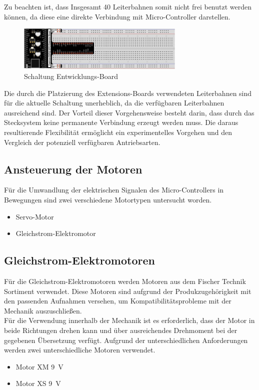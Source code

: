 \documentclass[conference,compsoc,final,a4paper]{IEEEtran}
\begin{document}
\noindent Zu beachten ist, dass Insgesamt 40 Leiterbahnen somit nicht frei benutzt werden können, da diese eine direkte Verbindung mit Micro-Controller darstellen.
\begin{figure}[h]
\centering
\includegraphics[width=8cm]{../images/ext_board.png}
\caption{Schaltung Entwicklungs-Board \autocite{freenoveTutorial}}
\label{Elektrik:DevBoardext}
\end{figure}

\noindent Die durch die Platzierung des Extensions-Boards verwendeten Leiterbahnen sind für die aktuelle Schaltung unerheblich, da die verfügbaren Leiterbahnen ausreichend sind. Der Vorteil dieser Vorgehensweise besteht darin, dass durch das Stecksystem keine permanente Verbindung erzeugt werden muss. 
Die daraus resultierende Flexibilität ermöglicht ein experimentelles Vorgehen und den Vergleich der potenziell verfügbaren Antriebsarten.

\subsection{Ansteuerung der Motoren}
Für die Umwandlung der elektrischen Signalen des Micro-Controllers in Bewegungen sind zwei verschiedene Motortypen untersucht worden.

\begin{itemize}[h]
	\item Servo-Motor
	\item Gleichstrom-Elektromotor
\end{itemize}

\subsection{Gleichstrom-Elektromotoren}
\noindent Für die Gleichstrom-Elektromotoren werden Motoren aus dem Fischer Technik Sortiment verwendet. 
Diese Motoren sind aufgrund der Produkzugehörigkeit mit den passenden Aufnahmen versehen, um Kompatibilitätsprobleme mit der Mechanik auszuschließen.
\\


\noindent Für die Verwendung innerhalb der Mechanik ist es erforderlich, dass der Motor in beide Richtungen drehen kann und über ausreichendes Drehmoment bei der gegebenen Übersetzung verfügt.
Aufgrund der unterschiedlichen Anforderungen werden zwei unterschiedliche Motoren verwendet.
\begin{itemize}[h]
\item Motor XM \qty{9}{V}
\item Motor XS \qty{9}{V}
\end{itemize}
\end{document}
